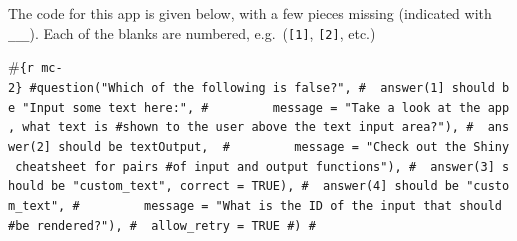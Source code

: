 \documentclass[
  letterpaper,
  DIV=11,
  numbers=noendperiod]{scrreprt}
\newenvironment{Shaded}{\begin{snugshade}}{\end{snugshade}}
\newcommand{\AttributeTok}[1]{\textcolor[rgb]{0.40,0.46,0.14}{#1}}
\newcommand{\ControlFlowTok}[1]{\textcolor[rgb]{0.00,0.46,0.62}{#1}}
\newcommand{\DecValTok}[1]{\textcolor[rgb]{0.68,0.00,0.00}{#1}}
\newcommand{\FunctionTok}[1]{\textcolor[rgb]{0.28,0.35,0.67}{#1}}
\newcommand{\NormalTok}[1]{\textcolor[rgb]{0.00,0.46,0.62}{#1}}
\newcommand{\OtherTok}[1]{\textcolor[rgb]{0.00,0.46,0.62}{#1}}
\newcommand{\SpecialCharTok}[1]{\textcolor[rgb]{0.37,0.37,0.37}{#1}}
\newcommand{\StringTok}[1]{\textcolor[rgb]{0.13,0.47,0.30}{#1}}
\begin{document}
The code for this app is given below, with a few pieces missing
(indicated with \texttt{\_\_\_}). Each of the blanks are numbered,
e.g.~(\texttt{{[}1{]}}, \texttt{{[}2{]}}, etc.)

\begin{Shaded}
\end{Shaded}

\#\texttt{\{r\ mc-2\}\ \#question("Which\ of\ the\ following\ is\ false?",\ \#\ \ answer(\textquotesingle{}\textasciigrave{}{[}1{]}\textasciigrave{}\ should\ be\ \textasciigrave{}"Input\ some\ text\ here:"\textasciigrave{}\textquotesingle{},\ \#\ \ \ \ \ \ \ \ \ message\ =\ "Take\ a\ look\ at\ the\ app,\ what\ text\ is\ \#shown\ to\ the\ user\ above\ the\ text\ input\ area?"),\ \#\ \ answer(\textquotesingle{}\textasciigrave{}{[}2{]}\textasciigrave{}\ should\ be\ \textasciigrave{}textOutput\textasciigrave{}\textquotesingle{},\ \ \#\ \ \ \ \ \ \ \ \ message\ =\ "Check\ out\ the\ Shiny\ cheatsheet\ for\ pairs\ \#of\ input\ and\ output\ functions"),\ \#\ \ answer(\textquotesingle{}\textasciigrave{}{[}3{]}\textasciigrave{}\ should\ be\ \textasciigrave{}"custom\_text"\textasciigrave{}\textquotesingle{},\ correct\ =\ TRUE),\ \#\ \ answer(\textquotesingle{}\textasciigrave{}{[}4{]}\textasciigrave{}\ should\ be\ \textasciigrave{}"custom\_text"\textasciigrave{}\textquotesingle{},\ \#\ \ \ \ \ \ \ \ \ message\ =\ "What\ is\ the\ ID\ of\ the\ input\ that\ should\ \#be\ rendered?"),\ \#\ \ allow\_retry\ =\ TRUE\ \#)\ \#}
\end{document}
